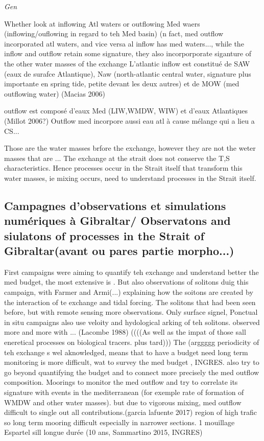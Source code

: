 \textit{Gen}

Whether look at inflowing Atl waters or outflowing Med waers (inflowing/ouflowing in regard to teh Med basin) (n fact, med outflow incorporated atl waters, and vice versa al inflow has med waters..., while the inflow and outflow retain some signature, they also incorporporate siganture of the other water masses of the exchange
L’atlantic inflow est constitué de SAW (eaux de surafce Atlantique), Naw (north-atlantic central water, signature plus importante en spring tide, petite devant les deux autres) et de MOW (med outflowing water) (Macias 2006)

outflow est composé d’eaux Med (LIW,WMDW, WIW) et d’eaux Atlantiques (Millot 2006?)
Outflow med incorpore aussi eau atl à cause mélange qui a lieu a CS...   

Those are the water masses brfore the exchange, however they are not the weter masses that are ... The exchange at the strait does not conserve the T,S characteristics. Hence processes occur in the Strait itself that transform this water masses, ie mixing occurs, need to understand processes in the Strait itself.

\subsection{Campagnes d'observations et simulations numériques à Gibraltar/ Observatons and siulatons of processes in the Strait of Gibraltar(avant ou pares partie morpho...)}


First campaigns were aiming to quantify teh exchange and understand better the med budget, the most extensive is  . But also observations of solitons duig this campaign, with Farmer and Armi(...) explaining how the soitons are created by the interaction of te exchange and tidal forcing. The solitons that had been seen before, but with remote sensing more observations. Only surface signel, Ponctual in situ campaigns also use veloity and hydological arking of teh solitons. observed more and more with ... (Lacombe 1988) ((((As well as the impat of those sall eneretical processes on biological tracers. plus tard)))
The (arggggg periodicity of teh exchange s wel aknowledged, means that to have a budget need long term monitoring is more difficult, wat to survey the med budget , INGRES. also try to go beyond quantifying the budget and to connect more precisely the med outflow composition.
Moorings to monitor the med outflow and try to correlate its signature with events in the mediterranean (for exemple rate of formation of WMDW and other water masses). but due to vigorous mixing, med outflow difficult to single out all contributions.(garcia lafuente 2017) region of high trafic so long term mooring difficult especially in narrower sections. 1 mouillage Espartel sill longue durée (10 ans, Sammartino 2015, INGRES)

